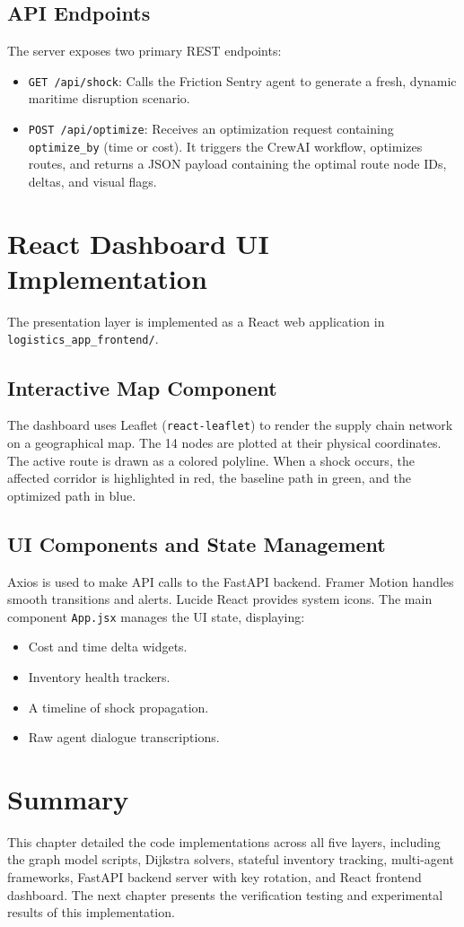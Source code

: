 \subsection{API Endpoints}
The server exposes two primary REST endpoints:
\begin{itemize}
    \item \texttt{GET /api/shock}: Calls the Friction Sentry agent to generate a fresh, dynamic maritime disruption scenario.
    \item \texttt{POST /api/optimize}: Receives an optimization request containing \texttt{optimize\_by} (time or cost). It triggers the CrewAI workflow, optimizes routes, and returns a JSON payload containing the optimal route node IDs, deltas, and visual flags.
\end{itemize}

\section{React Dashboard UI Implementation}
The presentation layer is implemented as a React web application in \texttt{logistics\_app\_frontend/}. 

\subsection{Interactive Map Component}
The dashboard uses Leaflet (\texttt{react-leaflet}) to render the supply chain network on a geographical map. The 14 nodes are plotted at their physical coordinates. The active route is drawn as a colored polyline. When a shock occurs, the affected corridor is highlighted in red, the baseline path in green, and the optimized path in blue.

\subsection{UI Components and State Management}
Axios is used to make API calls to the FastAPI backend. Framer Motion handles smooth transitions and alerts. Lucide React provides system icons. The main component \texttt{App.jsx} manages the UI state, displaying:
\begin{itemize}
    \item Cost and time delta widgets.
    \item Inventory health trackers.
    \item A timeline of shock propagation.
    \item Raw agent dialogue transcriptions.
\end{itemize}

\section{Summary}
This chapter detailed the code implementations across all five layers, including the graph model scripts, Dijkstra solvers, stateful inventory tracking, multi-agent frameworks, FastAPI backend server with key rotation, and React frontend dashboard. The next chapter presents the verification testing and experimental results of this implementation.
